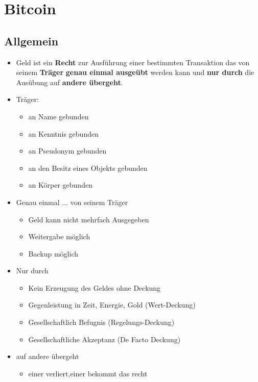 \documentclass{article} %
\begin{document}
	\section{Bitcoin}
	\subsection{Allgemein}
	\begin{itemize}
		\item \glqq Geld ist ein \textbf{Recht} zur Ausführung einer bestimmten Transaktion das von seinem \textbf{Träger} \textbf{genau einmal ausgeübt} werden kann und \textbf{nur durch} die Ausübung auf \textbf{andere übergeht}.\grqq
		\item \glqq Träger:\grqq
		\begin{itemize}
			\item an Name gebunden
			\item an Kenntnis gebunden
			\item an Pseudonym gebunden
			\item an den Besitz eines Objekts gebunden
			\item an Körper gebunden
		\end{itemize}
		\item \glqq Genau einmal ... von seinem Träger \grqq
		\begin{itemize}
			\item Geld kann nicht mehrfach Ausgegeben
			\item Weitergabe möglich
			\item Backup möglich
		\end{itemize}
		\item \glqq Nur durch\grqq
		\begin{itemize}
			\item Kein Erzeugung des Geldes ohne Deckung
			\item Gegenleistung in Zeit, Energie, Gold (Wert-Deckung)
			\item Gesellschaftlich Befugnis (Regelungs-Deckung)
			\item Gesellschaftliche Akzeptanz (De Facto Deckung)
		\end{itemize}
		\item \glqq auf andere übergeht\grqq
		\begin{itemize}
			\item einer verliert,einer bekommt das recht
		\end{itemize}
	\end{itemize}
\end{document}
